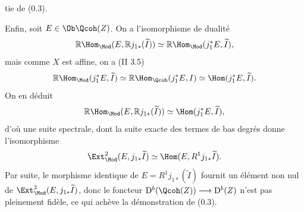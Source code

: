 tie de (0.3).

Enfin, soit $E\in\Ob\Qcoh(Z)$. On a l'isomorphisme de dualité
\[
 \mathbb R\Hom_{\Mod}(E,\mathbb Rj_{1*}(\widetilde I))
 \simeq \mathbb R\Hom_{\Mod}(j_1^*E,\widetilde I),
\]
mais comme $X$ est affine, on a (II 3.5)
\[
 \mathbb R\Hom_{\Mod}(j_1^*E,\widetilde I)
 \simeq \mathbb R\Hom_{\Qcoh}(j_1^*E,I)
 \simeq \Hom(j_1^*E,\widetilde I).
\]
On en déduit
\[
 \mathbb R\Hom_{\Mod}(E,\mathbb Rj_{1*}(\widetilde I))
 \simeq \Hom(j_1^*E,\widetilde I),
\]
d'où une suite spectrale, dont la suite exacte des termes de bas degrés donne l'isomorphisme
\[
 \Ext^2_{\Mod}(E,j_{1*}\widetilde I)
 \simeq \Hom(E,R^1j_{1*}\widetilde I).
\]
Par suite, le morphisme identique de $E=R^1j_{1*}(\widetilde I)$ fournit un élément non nul de $\Ext^2_{\Mod}(E,j_{1*}\widetilde I)$, donc le foncteur $\mathrm D^b(\Qcoh(Z))\longrightarrow \mathrm D^b(Z)$ n'est pas pleinement fidèle, ce qui achève la démonstration de (0.3).



\providecommand{\cO}{\mathcal O}
\providecommand{\cE}{\mathscr E}
\providecommand{\cF}{\mathscr F}
\providecommand{\cG}{\mathscr G}
\providecommand{\cH}{\mathcal H}
\providecommand{\cL}{\mathscr L}
\providecommand{\cP}{\mathscr P}
\providecommand{\cM}{\mathscr M}
\providecommand{\cD}{\mathcal D}
\providecommand{\R}{\mathbb R}
\providecommand{\C}{\mathbb C}
\providecommand{\N}{\mathbb N}
\providecommand{\Zell}{\mathbb Z_\ell}
\providecommand{\Qell}{\mathbb Q_\ell}
\providecommand{\C}{\mathbb C}
\providecommand{\Ch}{\operatorname{Ch}}
\providecommand{\Sym}{\operatorname{Sym}}
\providecommand{\Td}{\operatorname{Td}}
\providecommand{\Diff}{\operatorname{Diff}}
\providecommand{\Homop}{\operatorname{Hom}}
\providecommand{\Spec}{\operatorname{Spec}}
\providecommand{\pr}{\operatorname{pr}}
\providecommand{\ind}{\operatorname{ind}}
\providecommand{\soft}{\operatorname{soft}}
\providecommand{\Ban}{\operatorname{Ban}}
\providecommand{\Lop}{\operatorname{L}}
\providecommand{\im}{\operatorname{Im}}
\providecommand{\Parf}{\operatorname{Parf}}
\renewcommand{\id}{\operatorname{id}}

\newpage
